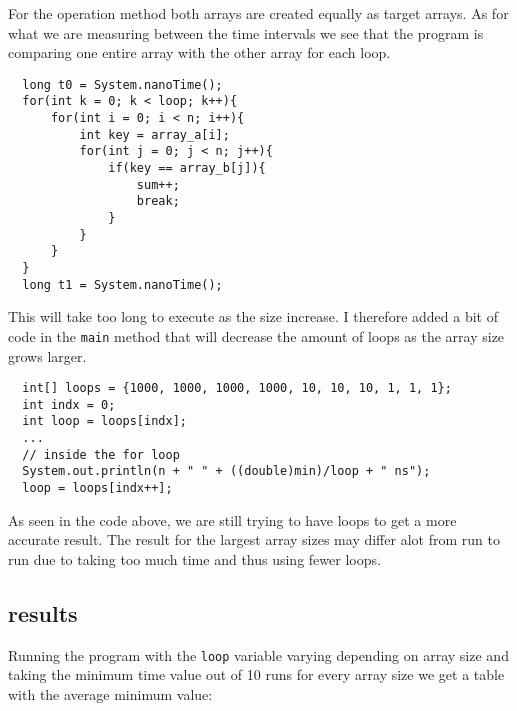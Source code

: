 \documentclass[a4paper,11pt]{article}
\begin{document}
For the operation method both arrays are created equally as target 
arrays. As for what we are measuring between the time intervals we see
that the program is comparing one entire array with the other array for
each loop. 

\begin{verbatim}
  long t0 = System.nanoTime();
  for(int k = 0; k < loop; k++){
      for(int i = 0; i < n; i++){
          int key = array_a[i];
          for(int j = 0; j < n; j++){
              if(key == array_b[j]){
                  sum++;
                  break;
              }
          }
      }
  }
  long t1 = System.nanoTime();
\end{verbatim}

This will take too long to execute as the size increase. I therefore
added a bit of code in the {\tt main} method that will decrease the
amount of loops as the array size grows larger. 

\begin{verbatim}
  int[] loops = {1000, 1000, 1000, 1000, 10, 10, 10, 1, 1, 1};
  int indx = 0;
  int loop = loops[indx];
  ...
  // inside the for loop
  System.out.println(n + " " + ((double)min)/loop + " ns");
  loop = loops[indx++];
\end{verbatim}

As seen in the code above, we are still trying to have loops to get a
more accurate result. The result for the largest array sizes may differ
alot from run to run due to taking too much time and thus using fewer
loops.

\subsection*{results}

Running the program with the {\tt loop} variable varying depending on 
array size and taking the minimum time value out of 10 runs for every 
array size we get a table with the average minimum value:
\end{document}
